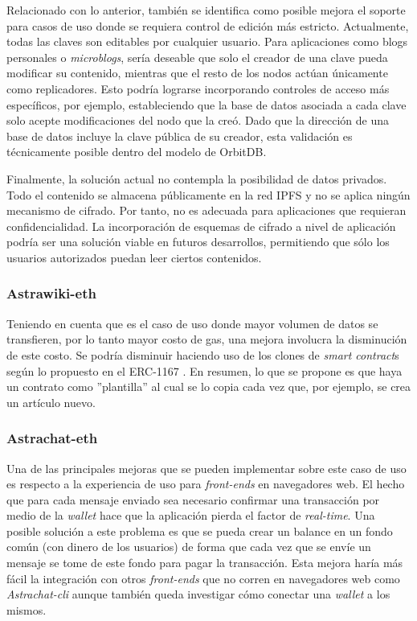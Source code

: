 Relacionado con lo anterior, también se identifica como posible mejora el soporte para casos de uso donde se requiera control de edición más estricto. Actualmente, todas las claves son editables por cualquier usuario. Para aplicaciones como blogs personales o \textit{microblogs}, sería deseable que solo el creador de una clave pueda modificar su contenido, mientras que el resto de los nodos actúan únicamente como replicadores. Esto podría lograrse incorporando controles de acceso más específicos, por ejemplo, estableciendo que la base de datos asociada a cada clave solo acepte modificaciones del nodo que la creó. Dado que la dirección de una base de datos incluye la clave pública de su creador, esta validación es técnicamente posible dentro del modelo de OrbitDB.

Finalmente, la solución actual no contempla la posibilidad de datos privados. Todo el contenido se almacena públicamente en la red IPFS y no se aplica ningún mecanismo de cifrado. Por tanto, no es adecuada para aplicaciones que requieran confidencialidad. La incorporación de esquemas de cifrado a nivel de aplicación podría ser una solución viable en futuros desarrollos, permitiendo que sólo los usuarios autorizados puedan leer ciertos contenidos.

\subsubsection{Astrawiki-eth}

Teniendo en cuenta que es el caso de uso donde mayor volumen de datos se transfieren, por lo tanto mayor costo de gas, una mejora involucra la disminución de este costo. Se podría disminuir haciendo uso de los clones de \textit{smart contract}s según lo propuesto en el ERC-1167 \cite{erc-1167}. En resumen, lo que se propone es que haya un contrato como ''plantilla'' al cual se lo copia cada vez que, por ejemplo, se crea un artículo nuevo.

\subsubsection{Astrachat-eth}

Una de las principales mejoras que se pueden implementar sobre este caso de uso es respecto a la experiencia de uso para \textit{front-ends} en navegadores web. El hecho que para cada mensaje enviado sea necesario confirmar una transacción por medio de la \textit{wallet} hace que la aplicación pierda el factor de \textit{real-time}. Una posible solución a este problema es que se pueda crear un balance en un fondo común (con dinero de los usuarios) de forma que cada vez que se envíe un mensaje se tome de este fondo para pagar la transacción. Esta mejora haría más fácil la integración con otros \textit{front-ends} que no corren en navegadores web como \textit{Astrachat-cli} aunque también queda investigar cómo conectar una \textit{wallet} a los mismos.

